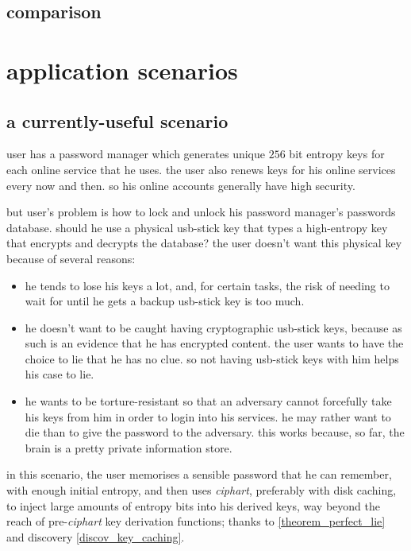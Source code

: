 \documentclass[twocolumn]{article}
\begin{document}
\subsection{comparison}

\section{application scenarios}
\subsection{a currently-useful scenario}
user has a password manager which generates unique $256$ bit entropy keys for
each online service that he uses.  the user also renews keys for his online
services every now and then.   so his online accounts generally have high
security.

but user's problem is how to lock and unlock his password manager's
passwords database.  should he use a physical usb-stick key that types a
high-entropy key that encrypts and decrypts the database?   the user
doesn't want this physical key because of several reasons:
\begin{itemize}
    \item he tends to lose his keys a lot, and, for certain tasks, the risk
    of needing to wait for until he gets a backup usb-stick key is too
    much.

    \item he doesn't want to be caught having cryptographic usb-stick keys,
    because as such is an evidence that he has encrypted content.  the user
    wants to have the choice to lie that he has no clue.  so not having
    usb-stick keys with him helps his case to lie.

    \item he wants to be torture-resistant so that an adversary cannot
    forcefully take his keys from him in order to login into his services.
    he may rather want to die than to give the password to the adversary.
    this works because, so far, the brain is a pretty private information
    store.
\end{itemize}

in this scenario, the user memorises a sensible password that he can
remember, with enough initial entropy, and then uses \emph{ciphart},
preferably with disk caching, to inject large amounts of entropy bits into
his derived keys, way beyond the reach of pre-\emph{ciphart} key derivation
functions; thanks to \cref{theorem_perfect_lie} and discovery
\ref{discov_key_caching}.
\end{document}
